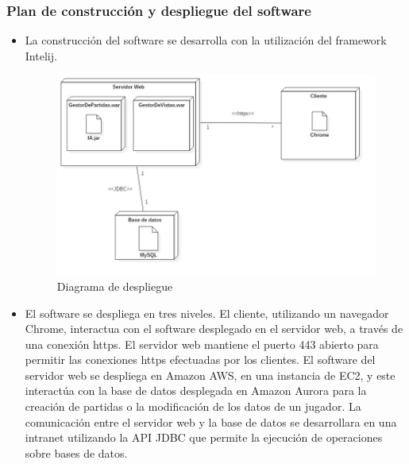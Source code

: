 \subsubsection{Plan de construcción y despliegue del software}
\begin{itemize}
\item { La construcción del software se desarrolla con la utilización del framework Intelij.}
\begin{figure}[H]
\centering
\includegraphics[scale = 0.4]{figuras/despliegue.jpg}
\caption{Diagrama de despliegue}
\label{fig:diagramaDespliegue}
\end{figure}

    \item{ El software se despliega en tres niveles. El cliente, utilizando un navegador Chrome, interactua con el software desplegado en el servidor web, a través de una conexión https. El servidor web mantiene  el puerto 443 abierto para permitir las conexiones https efectuadas por los clientes. El software del servidor web se despliega en Amazon AWS, en una instancia de EC2, y este interactúa con la base de datos desplegada en Amazon Aurora para la creación de partidas o la modificación de los datos de un jugador. La comunicación entre el servidor web y la base de datos se desarrollara en una intranet utilizando la API JDBC que permite la ejecución de operaciones sobre bases de datos.}
\end{itemize}
